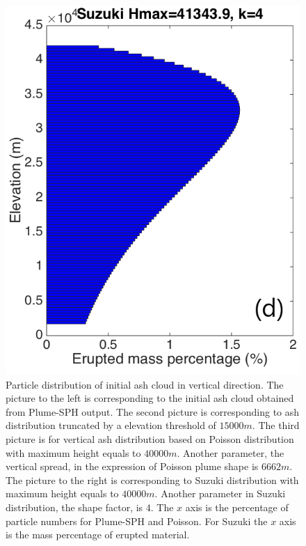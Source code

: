 \documentclass[utf8]{frontiersSCNS} %
\begin{document}
\begin{figure}[!htb]
\begin{minipage}{.247 \textwidth}
\end{minipage}%
\begin{minipage}{.247 \textwidth}
\centering
\includegraphics[width=0.99 \textwidth]{Figures/Suzuki-Hmax40k-ParticleDis-z}
\end{minipage}%
\caption{Particle distribution of initial ash cloud in vertical direction. The picture to the left is corresponding to the initial ash cloud obtained from Plume-SPH output. The second picture is corresponding to ash distribution truncated by a elevation threshold of $15000 m$. The third picture is for vertical ash distribution based on Poisson distribution with maximum height equals to $40000 m$. Another parameter, the vertical spread, in the expression of Poisson plume shape is $6662 m$. The picture to the right is corresponding to Suzuki distribution with maximum height equals to $40000 m$. Another parameter in Suzuki distribution, the shape factor, is $4$. The $x$ axis is the percentage of particle numbers for Plume-SPH and Poisson. For Suzuki the $x$ axis is the mass percentage of erupted material.}
\label{fig:Particle-distribution-Plume-SPH-vs-semiempirical}
\end{figure}
\end{document}
